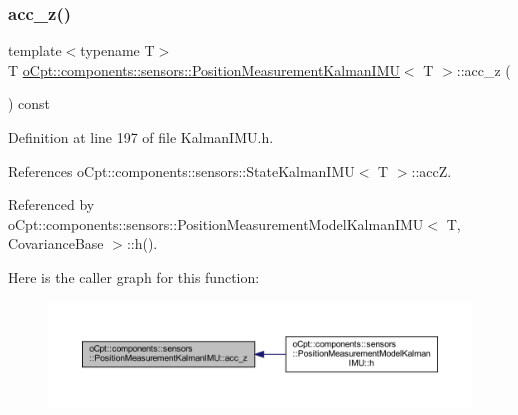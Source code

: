 \subsubsection{\texorpdfstring{acc\+\_\+z()}{acc\_z()}\hspace{0.1cm}{\footnotesize\ttfamily [1/2]}}
{\footnotesize\ttfamily template$<$typename T$>$ \\
T \hyperlink{classo_cpt_1_1components_1_1sensors_1_1_position_measurement_kalman_i_m_u}{o\+Cpt\+::components\+::sensors\+::\+Position\+Measurement\+Kalman\+I\+MU}$<$ T $>$\+::acc\+\_\+z (\begin{DoxyParamCaption}{ }\end{DoxyParamCaption}) const\hspace{0.3cm}{\ttfamily [inline]}}



Definition at line 197 of file Kalman\+I\+M\+U.\+h.



References o\+Cpt\+::components\+::sensors\+::\+State\+Kalman\+I\+M\+U$<$ T $>$\+::accZ.



Referenced by o\+Cpt\+::components\+::sensors\+::\+Position\+Measurement\+Model\+Kalman\+I\+M\+U$<$ T, Covariance\+Base $>$\+::h().

Here is the caller graph for this function\+:
\nopagebreak
\begin{figure}[H]
\begin{center}
\leavevmode
\includegraphics[width=350pt]{classo_cpt_1_1components_1_1sensors_1_1_position_measurement_kalman_i_m_u_a63dd831aac6136f1e55b373b3b7046c1_icgraph}
\end{center}
\end{figure}
\hypertarget{classo_cpt_1_1components_1_1sensors_1_1_position_measurement_kalman_i_m_u_a6637e65f5cbc67517e1b0832663555ea}{}\label{classo_cpt_1_1components_1_1sensors_1_1_position_measurement_kalman_i_m_u_a6637e65f5cbc67517e1b0832663555ea} 

